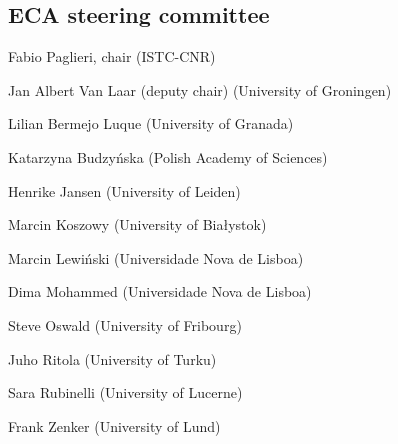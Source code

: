  	\subsection*{ECA steering committee}
 	\begin{compactitem}[]
		\item[] Fabio Paglieri, chair (ISTC-CNR)
		\item[] Jan Albert Van Laar (deputy chair) (University of Groningen)
		\item[] Lilian Bermejo Luque (University of Granada)
		\item[] Katarzyna Budzyńska (Polish Academy of Sciences)
		\item[] Henrike Jansen (University of Leiden)
		\item[] Marcin Koszowy (University of Białystok)
		\item[] Marcin Lewiński (Universidade Nova de Lisboa)
		\item[] Dima Mohammed (Universidade Nova de Lisboa)
		\item[] Steve Oswald (University of Fribourg)
		\item[] Juho Ritola (University of Turku)
		\item[]Sara Rubinelli (University of Lucerne)
		\item[] Frank Zenker (University of Lund)
	\end{compactitem}


